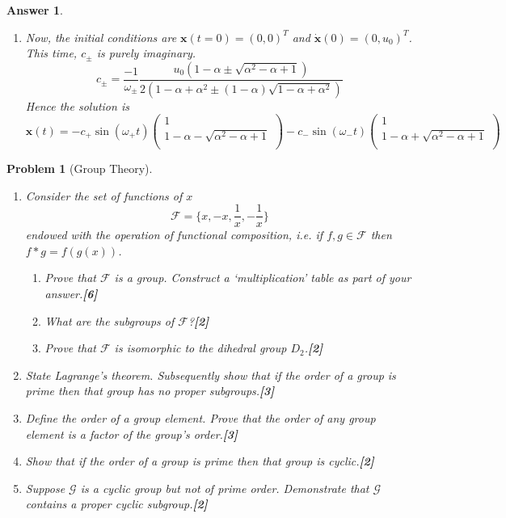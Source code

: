 \documentclass[a4paper]{article}
\newtheorem{ans}{Answer}[section]
\theoremstyle{new}
\newtheorem{qns}{Problem}[section]
\begin{document}
\begin{ans}
\begin{enumerate}[label=(\roman*)]
$$c_\pm=\frac{x_0(-1+2\alpha\mp\sqrt{\alpha^2-\alpha+1})}{2(1-\alpha+\alpha^2\pm(1-\alpha)\sqrt{1-\alpha+\alpha^2})}$$
Hence, the solution is 
$$\mathbf{x}(t)=c_+\cos(\omega_+t)\begin{pmatrix}1\\1-\alpha-\sqrt{\alpha^2-\alpha+1}\\\end{pmatrix}+c_-\cos(\omega_-t)\begin{pmatrix}1\\1-\alpha+\sqrt{\alpha^2-\alpha+1}\\\end{pmatrix}$$
\item Now, the initial conditions are $\mathbf{x}(t=0)=(0,0)^T$ and $\mathbf{\dot{x}}(0)=(0,u_0)^T$. This time, $c_\pm$ is purely imaginary.
$$c_\pm=\frac{-1}{\omega_\pm}\frac{u_0(1-\alpha\pm\sqrt{\alpha^2-\alpha+1})}{2(1-\alpha+\alpha^2\pm(1-\alpha)\sqrt{1-\alpha+\alpha^2})}$$
Hence the solution is $$\mathbf{x}(t)=-c_+\sin(\omega_+t)\begin{pmatrix}1\\1-\alpha-\sqrt{\alpha^2-\alpha+1}\\\end{pmatrix}-c_-\sin(\omega_-t)\begin{pmatrix}1\\1-\alpha+\sqrt{\alpha^2-\alpha+1}\\\end{pmatrix}$$
\end{enumerate}
\end{ans}
\begin{qns}[Group Theory]\leavevmode
\begin{enumerate}[label=(\roman*)]
\item Consider the set of functions of $x$
$$\mathcal{F}=\bigg\{x,-x,\frac{1}{x},-\frac{1}{x}\bigg\}$$
endowed with the operation of functional composition, i.e. if $f,g\in\mathcal{F}$ then $f *g = f(g(x))$.
\begin{enumerate}[label=(\alph*)]
\item Prove that $\mathcal{F}$ is a group. Construct a ‘multiplication’ table as part of your answer.\hfill\textbf{[6]}
\item What are the subgroups of $\mathcal{F}$?\hfill\textbf{[2]}
\item Prove that $\mathcal{F}$ is isomorphic to the dihedral group $D_2$.\hfill\textbf{[2]}
\end{enumerate}
\item State Lagrange’s theorem. Subsequently show that if the order of a group is prime then that group has no proper subgroups.\hfill\textbf{[3]}
\item Define the order of a group element. Prove that the order of any group element is a factor of the group’s order.\hfill\textbf{[3]}
\item Show that if the order of a group is prime then that group is cyclic.\hfill\textbf{[2]}
\item Suppose $\mathcal{G}$ is a cyclic group but not of prime order. Demonstrate that $\mathcal{G}$ contains a
proper cyclic subgroup.\hfill\textbf{[2]}
\end{enumerate}
\end{qns}
\end{document}
